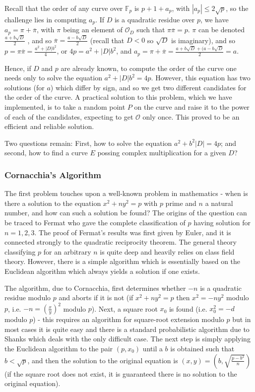 \documentclass[11pt,english]{article}
\begin{document}
Recall that the order of any curve over $\mathbb{F}_p$ is $p+1+a_p$, with $|a_p|\le2\sqrt{p}$, so the challenge lies in computing $a_p$. If $D$ is
a quadratic residue over $p$, we have $a_p=\pi+\overline{\pi}$, with $\pi$ being an element of $\mathcal{O}_D$ such that $\pi\overline{\pi}=p$.
$\pi$ can be denoted $\frac{a+b\sqrt{D}}{2}$ , and so $\overline{\pi}=\frac{a-b\sqrt{D}}{2}$ (recall that $D<0$ so $\sqrt{D}$ is imaginary),
and so $p=\pi\overline{\pi}=\frac{a^2+|D|b^2}{4}$, or $4p=a^2+|D|b^2$, and  $a_p=\pi+\overline{\pi}=\frac{a+b\sqrt{D}+(a-b\sqrt{D}}{2}=a$.

Hence, if $D$ and $p$ are already known, to compute the order of the curve one needs only to solve the equation $a^2+|D|b^2=4p$. However, this equation
has two solutions (for $a$) which differ by sign, and so we get two different candidates for the order of the curve. A practical solution to this problem, which
we have implemented, is to take a random point $P$ on the curve and raise it to the power of each of the candidates, expecting to get $\mathcal{O}$ only
once. This proved to be an efficient and reliable solution.

Two questions remain: First, how to solve the equation $a^2+b^2|D|=4p$; and second, how to find a curve $E$ possing complex multiplication for
a given $D$?

\subsubsection{Cornacchia's Algorithm}
The first problem touches upon a well-known problem in mathematics - when is there a solution to the equation $x^2+ny^2=p$ with $p$ prime and
$n$ a natural number, and how can such a solution be found? The origins of the question can be traced to Fermat who gave the complete classification of
$p$ having solution for $n=1,2,3$. The proof of Fermat's results was first given by Euler, and it is connected strongly to the quadratic reciprocity theorem.
The general theory classifying $p$ for an arbitrary $n$ is quite deep and heavily relies on class field theory. However, there is a simple algorithm which
is essentially based on the Euclidean algorithm which always yields a solution if one exists.

The algorithm, due to Cornacchia, first determines whether $-n$ is a quadratic residue modulo $p$ and aborts if it is not (if $x^2+ny^2=p$ then $x^2=-ny^2$ modulo $p$,
i.e. $-n=\left(\frac{x}{y}\right)^2$ modulo $p$). Next, a square root $x_0$ is found (i.e. $x_0^2=-d$ modulo $p$) - this requires an algorithm for square-root
extension modulo $p$ but in most cases it is quite easy and there is a standard probabilistic algorithm due to Shanks which deals with the only difficult case.
The next step is simply applying the Euclidean algorithm to the pair $(p,x_0)$ until a $b$ is obtained such that $b<\sqrt{p}$, and then the solution to the original equation
is $(x,y)=\left(b,\sqrt{\frac{p-b^2}{n}}\right)$ (if the square root does not exist, it is guaranteed there is no solution to the original equation).
\end{document}
